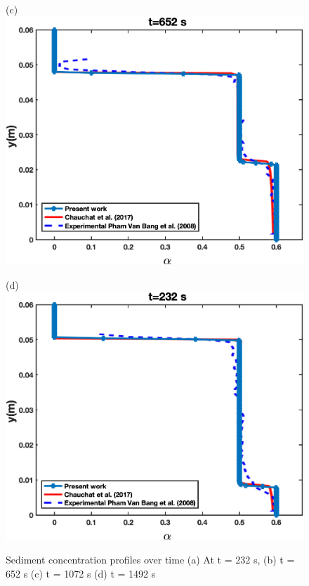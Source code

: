 \documentclass[11pt]{report}
\begin{document}
%
 \begin{figure}[ht!]
 \begin{center}
 (c)\includegraphics[scale = 0.45]{figs/E2}
 \end{center}
 \end{figure}
%
 \begin{figure}[ht!]
 \begin{center}
 (d)\includegraphics[scale = 0.45]{figs/E1}
 \end{center}
 \end{figure}
%
 \begin{figure}[ht!]
 \centering
 \caption{Sediment concentration profiles over time (a) At t = 232 s, (b) t = 652 s (c) t = 1072 s (d) t = 1492 s}
 \label{fig:laminar}
 \end{figure}
\end{document}
